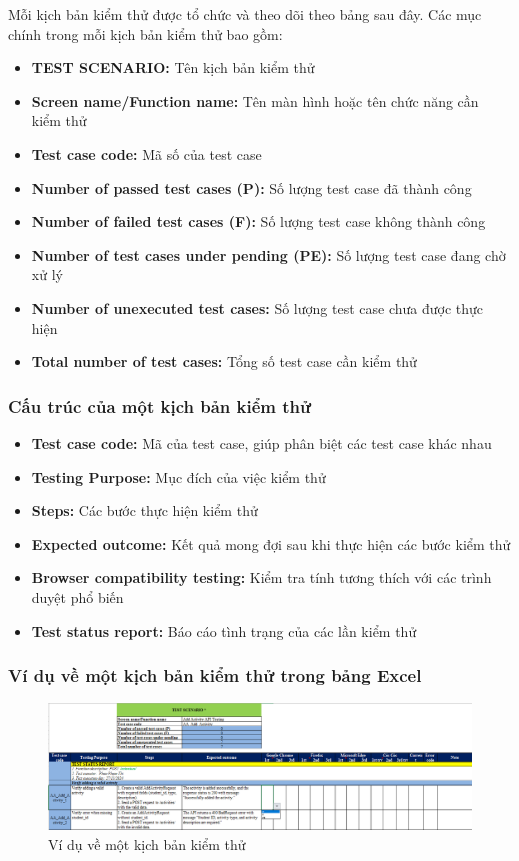 Mỗi kịch bản kiểm thử được tổ chức và theo dõi theo bảng sau đây. Các mục chính trong mỗi kịch bản kiểm thử bao gồm:
\begin{itemize}
    \item \textbf{TEST SCENARIO:} Tên kịch bản kiểm thử
    \item \textbf{Screen name/Function name:} Tên màn hình hoặc tên chức năng cần kiểm thử
    \item \textbf{Test case code:} Mã số của test case
    \item \textbf{Number of passed test cases (P):} Số lượng test case đã thành công
    \item \textbf{Number of failed test cases (F):} Số lượng test case không thành công
    \item \textbf{Number of test cases under pending (PE):} Số lượng test case đang chờ xử lý
    \item \textbf{Number of unexecuted test cases:} Số lượng test case chưa được thực hiện
    \item \textbf{Total number of test cases:} Tổng số test case cần kiểm thử
\end{itemize}

\subsubsection{Cấu trúc của một kịch bản kiểm thử}

\begin{itemize}
    \item \textbf{Test case code:} Mã của test case, giúp phân biệt các test case khác nhau
    \item \textbf{Testing Purpose:} Mục đích của việc kiểm thử
    \item \textbf{Steps:} Các bước thực hiện kiểm thử
    \item \textbf{Expected outcome:} Kết quả mong đợi sau khi thực hiện các bước kiểm thử
    \item \textbf{Browser compatibility testing:} Kiểm tra tính tương thích với các trình duyệt phổ biến
    \item \textbf{Test status report:} Báo cáo tình trạng của các lần kiểm thử
\end{itemize}

\subsubsection{Ví dụ về một kịch bản kiểm thử trong bảng Excel}
\begin{figure}[H]
    \centering
    \includegraphics[scale=0.5]{Images/Implement/testScenario.png}
    \caption{Ví dụ về một kịch bản kiểm thử}
\end{figure}
